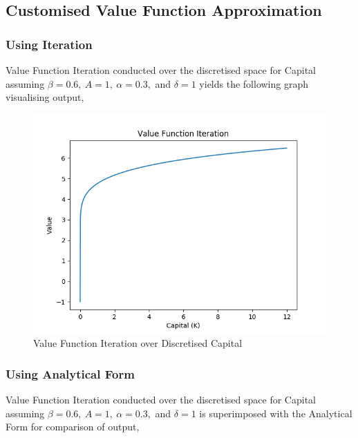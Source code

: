 \documentclass{article}
\begin{document}
\newpage

\subsection{Customised Value Function Approximation}

\subsubsection{Using Iteration}

Value Function Iteration conducted over the discretised space for Capital assuming $\beta=0.6, \ A=1, \ \alpha=0.3,$ and $\delta=1$ yields the following graph visualising output,

\begin{figure}[h]
\begin{center}
\includegraphics[width=\textwidth]{Figure1.png}
\caption{Value Function Iteration over Discretised Capital}
\end{center}
\end{figure}
\FloatBarrier

\newpage

\subsubsection{Using Analytical Form}

Value Function Iteration conducted over the discretised space for Capital assuming $\beta=0.6, \ A=1, \ \alpha=0.3,$ and $\delta=1$ is superimposed with the Analytical Form for comparison of output,
\end{document}

